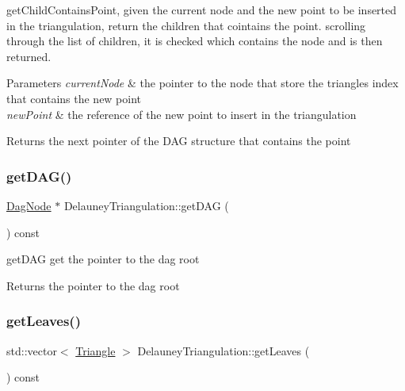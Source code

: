 get\+Child\+Contains\+Point, given the current node and the new point to be inserted in the triangulation, return the children that cointains the point. scrolling through the list of children, it is checked which contains the node and is then returned. 


\begin{DoxyParams}{Parameters}
{\em current\+Node} & the pointer to the node that store the triangle\textquotesingle{}s index that contains the new point \\
\hline
{\em new\+Point} & the reference of the new point to insert in the triangulation \\
\hline
\end{DoxyParams}
\begin{DoxyReturn}{Returns}
the next pointer of the D\+AG structure that contains the point 
\end{DoxyReturn}
\mbox{\label{classDelauneyTriangulation_a4d9be06e34b8e48dc4f2eceb719094fd}} 
\subsubsection{\texorpdfstring{get\+D\+A\+G()}{getDAG()}}
{\footnotesize\ttfamily \hyperlink{classDagNode}{Dag\+Node} $\ast$ Delauney\+Triangulation\+::get\+D\+AG (\begin{DoxyParamCaption}{ }\end{DoxyParamCaption}) const\hspace{0.3cm}{\ttfamily [inline]}}



get\+D\+AG get the pointer to the dag root 

\begin{DoxyReturn}{Returns}
the pointer to the dag root 
\end{DoxyReturn}
\mbox{\label{classDelauneyTriangulation_af18a99c7d626b657f7f7eb34f6d359b6}} 
\subsubsection{\texorpdfstring{get\+Leaves()}{getLeaves()}}
{\footnotesize\ttfamily std\+::vector$<$ \hyperlink{classTriangle}{Triangle} $>$ Delauney\+Triangulation\+::get\+Leaves (\begin{DoxyParamCaption}{ }\end{DoxyParamCaption}) const\hspace{0.3cm}{\ttfamily [inline]}}



